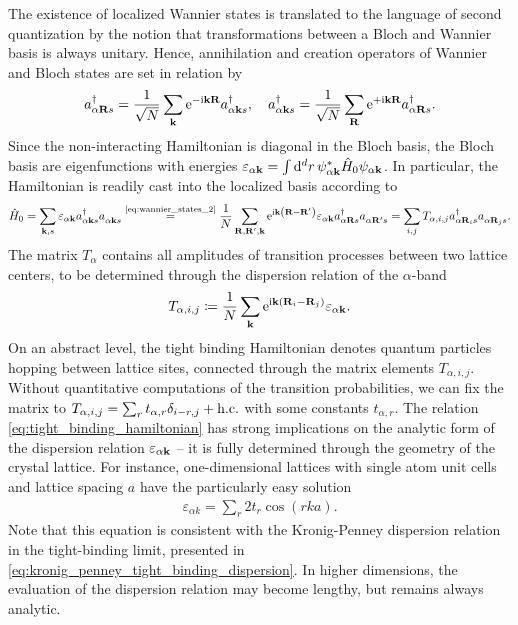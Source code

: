 The existence of localized Wannier states is translated to the language of second quantization by the notion that transformations between a Bloch and Wannier basis is always unitary.
Hence, annihilation and creation operators of Wannier and Bloch states are set in relation by
\begin{align}
    a^\dag_{\alpha{\bf R}s} = \frac1{\sqrt N}\sum_{\bf k}\mathrm e^{-\mathrm i{\bf k}{\bf R}}a^\dag_{\alpha{\bf k}s},
    \quad
    a^\dag_{\alpha{\bf k}s} = \frac1{\sqrt N}\sum_{\bf R}\mathrm e^{+\mathrm i{\bf k}{\bf R}}a^\dag_{\alpha{\bf R}s}.
    \label{eq:wannier_states_2}
\end{align}
Since the non-interacting Hamiltonian is diagonal in the Bloch basis, the Bloch basis are eigenfunctions with energies $\varepsilon_{\alpha{\bf k}} = \int\mathrm d^dr\, \psi_{\alpha{\bf k}}^* \hat H_0 \psi_{\alpha{\bf k}}$.
In particular, the Hamiltonian is readily cast into the localized basis according to
\begin{align}
    \hat H_0
    =
    \sum_{{\bf k},s}\varepsilon_{\alpha{\bf k}}a^\dag_{\alpha{\bf k}s}a^\pdag_{\alpha{\bf k}s}
    \overset{\text{\cref{eq:wannier_states_2}}}{=}
    \frac1N\sum_{\bf R, R', k}
    \re^{\ri{\bf k}\brlr{{\bf R}-{\bf R'}}}
    \varepsilon_{\alpha{\bf k}}
    a^\dag_{\alpha{\bf R}s}a^\pdag_{\alpha{\bf R'}s}
    =
    \sum_{i, j}T_{\alpha,i,j}
    a^\dag_{\alpha{\bf R}_is}a^\pdag_{\alpha{\bf R}_js}.
    \label{eq:tight_binding_hamiltonian}
\end{align}
The matrix $T_{\alpha}$ contains all amplitudes of transition processes between two lattice centers, to be determined through the dispersion relation of the $\alpha$-band
\begin{align}
    T_{\alpha,i,j} \coloneqq \frac1N\sum_{\bf k}\mathrm e^{\mathrm i{\bf k}\left( {\bf R}_i-{\bf R}_j \right)}\varepsilon_{\alpha{\bf k}}.
\end{align}
On an abstract level, the tight binding Hamiltonian denotes quantum particles hopping between lattice sites, connected through the matrix elements $T_{\alpha,i,j}$.
Without quantitative computations of the transition probabilities, we can fix the matrix to $T_{\alpha,i,j}=\sum_rt_{\alpha,r}\delta_{i-r,j} + {\rm h.c.}$ with some constants $t_{\alpha,r}$.
The relation \cref{eq:tight_binding_hamiltonian} has strong implications on the analytic form of the dispersion relation $\varepsilon_{\alpha{\bf k}}$ -- it is fully determined through the geometry of the crystal lattice.
For instance, one-dimensional lattices with single atom unit cells and lattice spacing $a$ have the particularly easy solution
\begin{align}
    \varepsilon_{\alpha k} = \sum_r 2t_r\cos(r ka).
    \label{eq:1D_tight_binding_dispersion}
\end{align}
Note that this equation is consistent with the Kronig-Penney dispersion relation in the tight-binding limit, presented in \cref{eq:kronig_penney_tight_binding_dispersion}.
In higher dimensions, the evaluation of the dispersion relation may become lengthy, but remains always analytic.
\\

